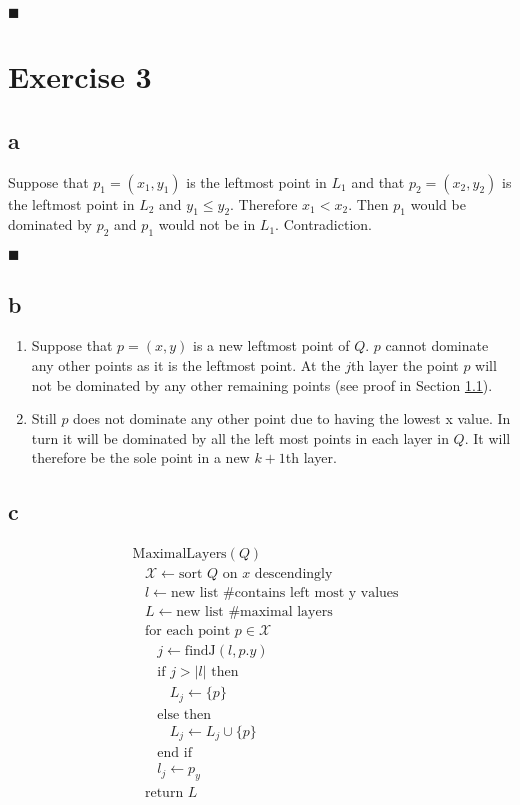 \documentclass[koma,a4paper]{article}
\begin{document}
\hfill\ensuremath{\blacksquare}

\section{Exercise 3}

\subsection{a}\label{sec:3a}
Suppose that $p_1 = (x_1, y_1)$ is the leftmost point in $L_1$ and that $p_2 = (x_2, y_2)$ is the leftmost point in $L_2$ and $y_1 \leq y_2$. Therefore $x_1 < x_2$. Then $p_1$ would be dominated by $p_2$ and $p_1$ would not be in $L_1$. Contradiction.

\hfill\ensuremath{\blacksquare}

\subsection{b}
\begin{enumerate}
  \item Suppose that $p = (x, y)$ is a new leftmost point of $Q$. $p$ cannot dominate any other points as it is the leftmost point. At the $j$th layer the point $p$ will not be dominated by any other remaining points (see proof in Section \ref{sec:3a}).
  \item Still $p$ does not dominate any other point due to having the lowest x value. In turn it will be dominated by all the left most points in each layer in $Q$. It will therefore be the sole point in a new $k+1$th layer.
\end{enumerate}

\subsection{c}
\begin{align*}
  &\text{MaximalLayers}(Q)\\
  &~~~~\mathcal{X} \leftarrow \text{sort } Q \text{ on } x \text{ descendingly}\\
  &~~~~l \leftarrow \text{new list \# contains left most y values}\\
  &~~~~L \leftarrow \text{new list \# maximal layers}\\
  &~~~~\text{for each point } p \in \mathcal{X} \\
  &~~~~~~~~j \leftarrow \text{findJ}(l, p.y)\\
  &~~~~~~~~\text{if } j > |l| \text{ then}\\
  &~~~~~~~~~~~~L_j \leftarrow \{p\}\\
  &~~~~~~~~\text{else then}\\
  &~~~~~~~~~~~~L_j \leftarrow L_j \cup \{p\}\\
  &~~~~~~~~\text{end if}\\
  &~~~~~~~~l_j \leftarrow p_y\\
  &~~~~\text{return } L
\end{align*}
\end{document}
